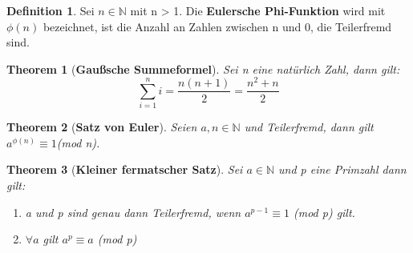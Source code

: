 \documentclass[12pt,oneside]{article}
\newtheorem{theorem}{Theorem}[section]
\theoremstyle{remark}
\theoremstyle{definition}
\newtheorem{definition}{Definition}[section]
\begin{document}
\smallskip

\begin{definition}\label{Df_6}
Sei $n \in \mathbb{N}$ mit n > 1. Die \textbf{Eulersche Phi-Funktion} wird mit $\phi(n)$ bezeichnet, ist die Anzahl an Zahlen zwischen n und 0, die Teilerfremd sind.
\end{definition}

\smallskip

\begin{theorem}[\textbf{Gaußsche Summeformel}]\label{gauss}
Sei n eine natürlich Zahl, dann gilt:
\begin{equation}
    \sum_{i = 1}^{n} i = \frac{n (n + 1)}{2} = \frac{n^2 + n}{2} 
\end{equation}
\end{theorem}

\smallskip
\begin{theorem}[\textbf{Satz von Euler}]\label{Th_1}
Seien $a,n \in \mathbb{N}$ und Teilerfremd, \newline dann gilt $a^{\phi(n)} \equiv 1 $(mod n).
\end{theorem}

\smallskip

\begin{theorem}[\textbf{Kleiner fermatscher Satz}]\label{Th_2}
Sei $a \in \mathbb{N}$ und p eine Primzahl dann gilt:\newline
\begin{enumerate}
    \item a und p sind genau dann Teilerfremd, wenn $a^{p-1} \equiv 1 $ (mod p) gilt.
    \newline
    \item $\forall a $ gilt  $a^p \equiv a$ (mod p)
\end{enumerate}
\end{theorem}

\end{document}
